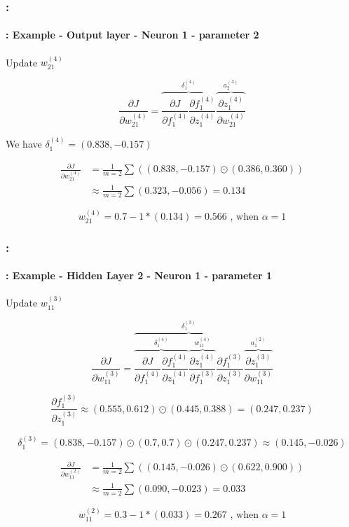 \documentclass[xcolor=table]{beamer}
\begin{document}
\begin{frame}
	\frametitle{\insertshortsubtitle: \insertsection}
	\framesubtitle{\insertsubsection: Example - Output layer - Neuron 1 - parameter 2}
	
	
	Update $w_{21}^{(4)}$
	
	\[
	\frac{\partial J}{\partial w_{21}^{(4)}} = \overbrace{\frac{\partial J}{\partial f_{1}^{(4)}} \frac{\partial f_{1}^{(4)}}{\partial z_{1}^{(4)}}}^{\delta_{1}^{(4)}} \overbrace{\frac{\partial z_{1}^{(4)}}{\partial w_{21}^{(4)}}}^{a_{2}^{(3)}}
	\]
	
	
	We have $\delta_{1}^{(4)} = (0.838, -0.157)$
	
	\begin{align*}
		\frac{\partial J}{\partial w_{21}^{(4)}} & = \frac{1}{m=2} \sum ((0.838, -0.157) \odot (0.386, 0.360))   \\
		& \approx \frac{1}{m=2} \sum (0.323, -0.056) = 0.134
	\end{align*}
	
	\[
	w_{21}^{(4)} = 0.7 - 1 * (0.134) = 0.566 \text{ , when } \alpha = 1
	\]
	
\end{frame}

\begin{frame}
	\frametitle{\insertshortsubtitle: \insertsection}
	\framesubtitle{\insertsubsection: Example - Hidden Layer 2 - Neuron 1 - parameter 1}
	
	Update $w_{11}^{(3)}$
	
	\small
	
	\vskip-24pt
	\[
	\frac{\partial J}{\partial w_{11}^{(3)}} = 
	\overbrace{
		\overbrace{
			\frac{\partial J}{\partial f_{1}^{(4)}} 
			\frac{\partial f_{1}^{(4)}}{\partial z_{1}^{(4)}}
		}^{\delta_{1}^{(4)}} 
		\overbrace{
			\frac{\partial z_{1}^{(4)}}{\partial f_{1}^{(3)}}
		}^{w_{11}^{(4)}} 
		\frac{\partial f_{1}^{(3)}}{\partial z_{1}^{(3)}} 
	}^{\delta_{1}^{(3)}} 
	\overbrace{
		\frac{\partial z_{1}^{(3)}}{\partial w_{11}^{(3)}}
	}^{a_{1}^{(2)}}
	\]
	
	\vskip-6pt
	\[
	\frac{\partial f_{1}^{(3)}}{\partial z_{1}^{(3)}} \approx 
	(0.555, 0.612) \odot (0.445, 0.388) = (0.247, 0.237)
	\]
	
	\vskip-6pt
	\[
	\delta_{1}^{(3)} = (0.838, -0.157) \odot (0.7, 0.7) \odot (0.247, 0.237) \approx (0.145, -0.026)
	\]
	
	\vskip-12pt
	\begin{align*}
		\frac{\partial J}{\partial w_{11}^{(2)}} & = \frac{1}{m=2} \sum ((0.145, -0.026) \odot (0.622, 0.900))   \\
		& \approx \frac{1}{m=2} \sum (0.090, -0.023) = 0.033
	\end{align*}
	
	
	\vskip-6pt
	\[
	w_{11}^{(2)} = 0.3 - 1 * (0.033) = 0.267 \text{ , when } \alpha = 1
	\]
	
\end{frame}
\end{document}
